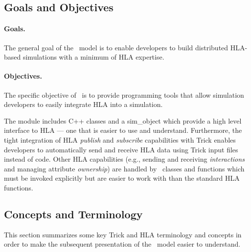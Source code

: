 \subsection{Goals and Objectives}

\paragraph{Goals.}
The general goal of the \TrickHLA\ model is to enable developers to build 
distributed HLA-based simulations with a minimum of HLA expertise.

\paragraph{Objectives.}
The specific objective of \TrickHLA\ is to provide programming tools
that allow simulation developers to easily integrate HLA into a simulation.

The module includes C++ classes and a {\ttfamily sim\_object} 
which provide a high level interface to HLA --- 
one that is easier to use and understand.
Furthermore, the tight integration of HLA {\em publish} and {\em subscribe}
capabilities with Trick enables developers to automatically send and receive 
HLA data using Trick input files instead of code.
Other HLA capabilities
(e.g., sending and receiving {\em interactions} 
and managing attribute {\em ownership})
are handled by \TrickHLA\ classes and functions which must be invoked
explicitly but are easier to work with than the standard HLA functions.

\subsection{Concepts and Terminology}

This section summarizes some key Trick and HLA terminology and concepts
in order to make the subsequent presentation of the \TrickHLA\ model
easier to understand.


